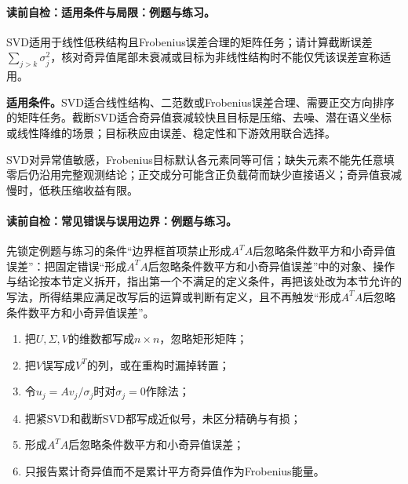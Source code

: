 \label{struct:V4-C03-CH28}
\paragraph{读前自检：适用条件与局限：例题与练习。}SVD适用于线性低秩结构且Frobenius误差合理的矩阵任务；请计算截断误差$\sum_{j>k}\sigma_j^2$，核对奇异值尾部未衰减或目标为非线性结构时不能仅凭该误差宣称适用。\par

\begin{applicabilitybox}
\textbf{适用条件。}SVD适合线性结构、二范数或Frobenius误差合理、需要正交方向排序的矩阵任务。截断SVD适合奇异值衰减较快且目标是压缩、去噪、潜在语义坐标或线性降维的场景；目标秩应由误差、稳定性和下游效用联合选择。
\end{applicabilitybox}

\label{struct:V4-C03-CH29}
\begin{notapplicablebox}[title=\SLMethodLimitationsTitle]
SVD对异常值敏感，Frobenius目标默认各元素同等可信；缺失元素不能先任意填零后仍沿用完整观测结论；正交成分可能含正负载荷而缺少直接语义；奇异值衰减慢时，低秩压缩收益有限。
\end{notapplicablebox}

\label{struct:V4-C03-CH30}
\paragraph{读前自检：常见错误与误用边界：例题与练习。}先锁定例题与练习的条件“边界框首项禁止形成$A^TA$后忽略条件数平方和小奇异值误差”：把固定错误“形成$A^TA$后忽略条件数平方和小奇异值误差”中的对象、操作与结论按本节定义拆开，指出第一个不满足的定义条件，再把该处改为本节允许的写法，所得结果应满足改写后的运算或判断有定义，且不再触发“形成$A^TA$后忽略条件数平方和小奇异值误差”。\par

\begin{warningbox}
\begin{enumerate}[leftmargin=2.2em]
  \item 把$U,\Sigma,V$的维数都写成$n\times n$，忽略矩形矩阵；
  \item 把$V$误写成$V^T$的列，或在重构时漏掉转置；
  \item 令$u_j=Av_j/\sigma_j$时对$\sigma_j=0$作除法；
  \item 把紧SVD和截断SVD都写成近似号，未区分精确与有损；
  \item 形成$A^TA$后忽略条件数平方和小奇异值误差；
  \item 只报告累计奇异值而不是累计平方奇异值作为Frobenius能量。
\end{enumerate}
\end{warningbox}

